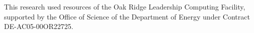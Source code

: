 This research used resources of the Oak Ridge Leadership Computing Facility,
supported by the Office of Science of the Department of Energy under Contract
DE-AC05-00OR22725.

